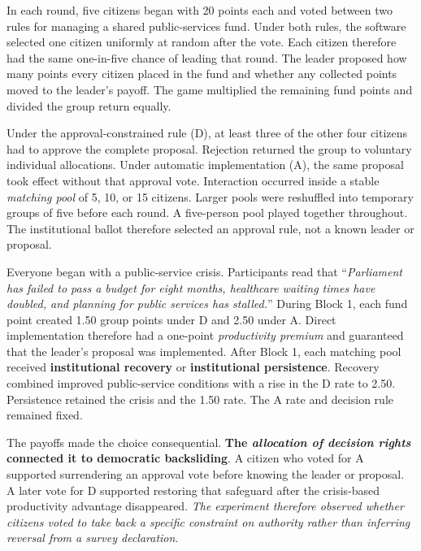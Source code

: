 \documentclass[11pt]{article}
\newcommand{\Dproc}{\textsf{D}}
\newcommand{\Aproc}{\textsf{A}}
\begin{document}
In each round, five citizens began with 20 points each and voted between two rules for managing a shared public-services fund. Under both rules, the software selected one citizen uniformly at random after the vote. Each citizen therefore had the same one-in-five chance of leading that round. The leader proposed how many points every citizen placed in the fund and whether any collected points moved to the leader's payoff. The game multiplied the remaining fund points and divided the group return equally.

Under the approval-constrained rule (\Dproc), at least three of the other four citizens had to approve the complete proposal. Rejection returned the group to voluntary individual allocations. Under automatic implementation (\Aproc), the same proposal took effect without that approval vote. Interaction occurred inside a stable \emph{matching pool} of 5, 10, or 15 citizens. Larger pools were reshuffled into temporary groups of five before each round. A five-person pool played together throughout. The institutional ballot therefore selected an approval rule, not a known leader or proposal.

Everyone began with a public-service crisis. Participants read that \enquote{\emph{Parliament has failed to pass a budget for eight months, healthcare waiting times have doubled, and planning for public services has stalled.}} During Block 1, each fund point created 1.50 group points under \Dproc{} and 2.50 under \Aproc{}. Direct implementation therefore had a one-point \emph{productivity premium} and guaranteed that the leader's proposal was implemented. After Block 1, each matching pool received {\bf institutional recovery} or {\bf institutional persistence}. Recovery combined improved public-service conditions with a rise in the \Dproc{} rate to 2.50. Persistence retained the crisis and the 1.50 rate. The \Aproc{} rate and decision rule remained fixed.

The payoffs made the choice consequential. {\bf The \emph{allocation of decision rights} connected it to democratic backsliding}. A citizen who voted for \Aproc{} supported surrendering an approval vote before knowing the leader or proposal. A later vote for \Dproc{} supported restoring that safeguard after the crisis-based productivity advantage disappeared. \emph{The experiment therefore observed whether citizens voted to take back a specific constraint on authority rather than inferring reversal from a survey declaration}.
\end{document}
